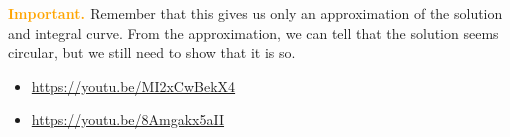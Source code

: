 \begin{example}
\textbf{\textcolor{orange}{Important. }} Remember that this gives us only an approximation of the solution and integral curve. From the approximation, we can tell that the solution seems circular, but we still need to show that it is so.

\end{example}





%



\begin{video}
\begin{itemize}
	\item \href{https://youtu.be/MI2xCwBekX4}{https://youtu.be/MI2xCwBekX4} \hfill {}
	\item \href{https://youtu.be/8Amgakx5aII}{https://youtu.be/8Amgakx5aII} \hfill {}
\end{itemize}	
\end{video}


